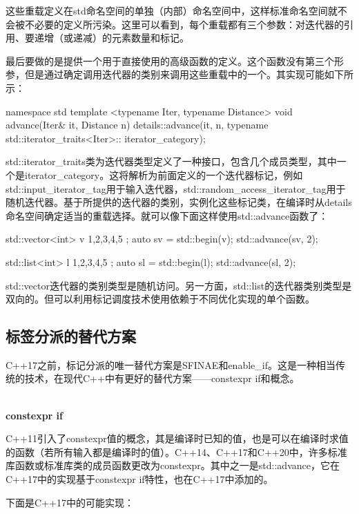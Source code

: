 这些重载定义在std命名空间的单独（内部）命名空间中，这样标准命名空间就不会被不必要的定义所污染。这里可以看到，每个重载都有三个参数：对迭代器的引用、要递增（或递减）的元素数量和标记。

最后要做的是提供一个用于直接使用的高级函数的定义。这个函数没有第三个形参，但是通过确定调用迭代器的类别来调用这些重载中的一个。其实现可能如下所示：

\begin{cpp}
namespace std
{
	template <typename Iter, typename Distance>
	void advance(Iter& it, Distance n)
	{
		details::advance(it, n,
			typename std::iterator_traits<Iter>::
								iterator_category{});
	}
}
\end{cpp}

std::iterator\_traits类为迭代器类型定义了一种接口，包含几个成员类型，其中一个是iterator\_category。这将解析为前面定义的一个迭代器标记，例如std::input\_iterator\_tag用于输入迭代器，std::random\_access\_iterator\_tag用于随机迭代器。基于所提供的迭代器的类别，实例化这些标记类，在编译时从details命名空间确定适当的重载选择。就可以像下面这样使用std::advance函数了：

\begin{cpp}
std::vector<int> v{ 1,2,3,4,5 };
auto sv = std::begin(v);
std::advance(sv, 2);

std::list<int> l{ 1,2,3,4,5 };
auto sl = std::begin(l);
std::advance(sl, 2);
\end{cpp}

std::vector迭代器的类别类型是随机访问。另一方面，std::list的迭代器类别类型是双向的。但可以利用标记调度技术使用依赖于不同优化实现的单个函数。

\subsection{标签分派的替代方案}

C++17之前，标记分派的唯一替代方案是SFINAE和enable\_if。这是一种相当传统的技术，在现代C++中有更好的替代方案——constexpr if和概念。

\noindent
\hspace*{\fill} \\ %
\textbf{constexpr if}

C++11引入了constexpr值的概念，其是编译时已知的值，也是可以在编译时求值的函数（若所有输入都是编译时的值）。C++14、C++17和C++20中，许多标准库函数或标准库类的成员函数更改为constexpr。其中之一是std::advance，它在C++17中的实现基于constexpr if特性，也在C++17中添加的。

下面是C++17中的可能实现：

